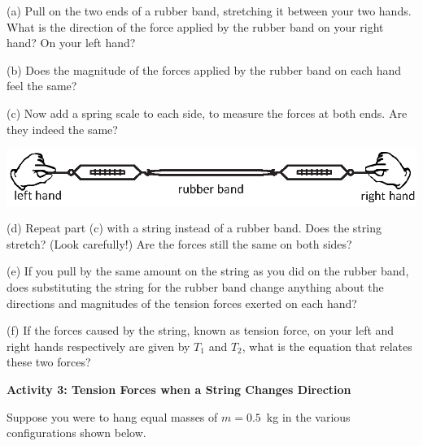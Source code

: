
(a) Pull on the two ends of a rubber band, stretching it between your two hands. 
What is the direction of the force applied
by the rubber band on your right hand? On your left hand?
\answerspace{20mm}

(b) Does the magnitude of the forces applied by the rubber band on each hand
feel the same?
\answerspace{20mm}

(c) Now add a spring scale to each side, to measure the forces at both ends.  Are they indeed the same?

{\par\centering \includegraphics{newton/hands_plus_scales.eps} \par}
\answerspace{20mm}

(d) Repeat part (c) with a string instead of a rubber band. 
Does the string stretch? (Look carefully!)  Are the forces still the same on both sides?
\answerspace{20mm}

(e) If you pull by the same amount on the string as you did on the rubber band,
does substituting the string for the rubber band change anything about the directions
and magnitudes of the tension forces exerted on each hand? 
\answerspace{10mm}

(f) If the forces caused by the string, known as tension force, on your left and right hands respectively
are given by $T_{1}$ and $T_{2}$, what is the equation that relates
these two forces?
\answerspace{20mm}

\pagebreak[3]
\textbf{Activity 3: Tension Forces when a String Changes Direction }

Suppose you were to hang equal masses of $m = 0.5$~kg in the various configurations
shown below. 

